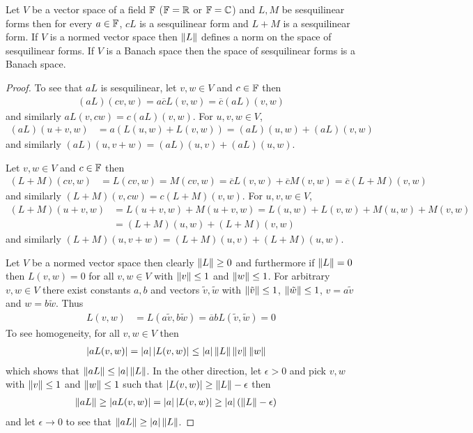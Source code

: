 \begin{prop}\label{hilbert:LinearCombinationSesquilinear}Let $V$ be a vector space of a field $\mathbb{F}$ ($\mathbb{F} = \mathbb{R}$ or $\mathbb{F} = \mathbb{C}$) and $L,M$ be sesquilinear forms then for every $a \in \mathbb{F}$, $cL$ is a sesquilinear form and $L+M$ is a sesquilinear form.  If $V$ is a normed vector space then $\left \lVert L \right \rVert$ defines a norm on the space of sesquilinear forms.  If $V$ is a Banach space then the space of sesquilinear forms is a Banach space.
\end{prop}
\begin{proof}
To see that $aL$ is sesquilinear, let $v,w \in V$ and $c \in \mathbb{F}$ then 
\begin{align*}
(aL)(cv, w)= a \overline{c} L(v,w) = \overline{c} (aL)(v,w)
\end{align*}
and similarly $aL(v, cw) = c (aL)(v,w)$.  For $u,v,w \in V$, 
\begin{align*}
(aL)(u+v, w) &=a(L(u,w) + L(v,w)) =(aL)(u,w) + (aL)(v,w)
\end{align*}
and similarly $(aL)(u,v+w) = (aL)(u,v)+(aL)(u,w)$.  

Let $v,w \in V$ and $c \in \mathbb{F}$ then 
\begin{align*}
(L+M)(cv, w)&= L(cv,w) = M(cv,w) = \overline{c} L(v,w)+\overline{c} M(v,w) = \overline{c} (L+M)(v,w)
\end{align*}
and similarly $(L+M)(v, cw) = c (L+M)(v,w)$.  For $u,v,w \in V$, 
\begin{align*}
(L+M)(u+v, w) &= L(u+v,w) + M(u+v,w) = L(u,w) + L(v,w) + M(u,w) + M(v,w) \\
&=(L+M)(u,w) + (L+M)(v,w)
\end{align*}
and similarly $(L+M)(u,v+w) = (L+M)(u,v)+(L+M)(u,w)$.

Let $V$ be a normed vector space then clearly $\left \lVert L \right \rVert \geq 0$ and furthermore if $\left \lVert L \right \rVert = 0$ then $L(v,w) = 0$ for all $v,w \in V$ with $\left \lVert v \right \rVert \leq 1$ and $\left \lVert w \right \rVert \leq 1$.  For arbitrary $v,w \in V$ there exist constants $a,b$ and vectors $\tilde{v}, \tilde{w}$ with $\left \lVert \tilde{v} \right \rVert \leq 1$, $\left \lVert \tilde{w} \right \rVert \leq 1$, $v = a \tilde{v}$ and $w= b\tilde{w}$.  Thus 
\begin{align*}
L(v,w) &= L(a\tilde{v}, b \tilde{w}) = \overline{a} b L(\tilde{v}, \tilde{w}) = 0
\end{align*}
To see homogeneity, for all $v, w \in V$ then
\begin{align*}
\left \vert aL(v,w) \right \vert &= \left \vert a \right \vert \left \vert L(v,w) \right \vert\leq \left \vert a \right \vert \left \lVert L \right \rVert \left \lVert v \right \rVert \left \lVert w \right \rVert
\end{align*}
which shows that $\left \lVert aL \right \rVert \leq \left \vert a \right \vert \left \lVert L \right \rVert$.  In the other direction, let $\epsilon > 0$ and pick $v,w$ with $\left \lVert v \right \rVert \leq 1$ and $\left \lVert w \right \rVert \leq 1$ such that $\left \vert L(v,w) \right \vert \geq \left \lVert L \right \rVert - \epsilon$ then 
\begin{align*}
\left \lVert aL \right \rVert &\geq \left \vert aL(v,w) \right \vert = \left \vert a \right \vert \left \vert L(v,w) \right \vert \geq \left \vert a \right \vert (\left \lVert L \right \rVert - \epsilon)
\end{align*}
and let $\epsilon \to 0$ to see that $\left \lVert aL \right \rVert \geq \left \vert a \right \vert \left \lVert L \right \rVert$.


\end{proof}
